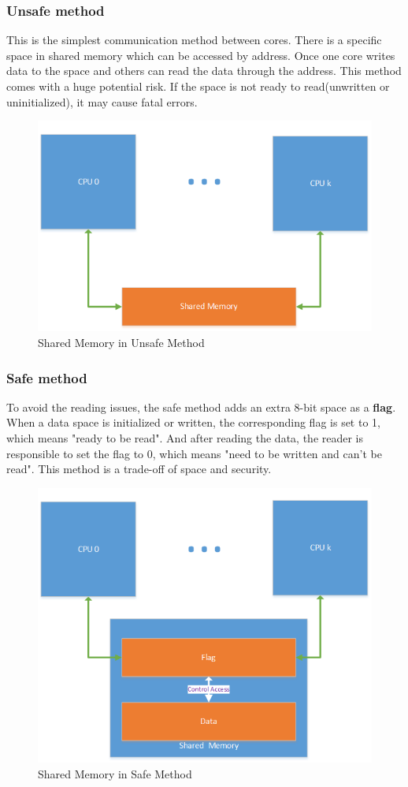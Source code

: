 \documentclass[conference]{IEEEtran}
\begin{document}
\subsubsection{Unsafe method} 
This is the simplest communication method between cores. There is a specific space in shared memory which can be accessed by address. Once one core writes data to the space and others can read the data through the address. This method comes with a huge potential risk. If the space is not ready to read(unwritten or uninitialized), it may cause fatal errors.
\begin{figure}[h]
	\centering
	\includegraphics[scale=0.5]{sharedmemoryunsafe.png}
	\caption{Shared Memory in Unsafe Method}
	\label{fig:unsafe}
\end{figure}
\subsubsection{Safe method}
To avoid the reading issues, the safe method adds an extra 8-bit space as a  \textbf{flag}. When a data space is initialized or written, the corresponding flag is set to 1, which means "ready to be read". And after reading the data, the reader is responsible to set the flag to 0, which means "need to be written and can't be read". This method is a trade-off of space and security. 
\begin{figure}[h]
	\centering
	\includegraphics[scale=0.5]{sharedmemorysafe.png}
	\caption{Shared Memory in Safe Method}
	\label{fig:safe}
\end{figure}
\end{document}
